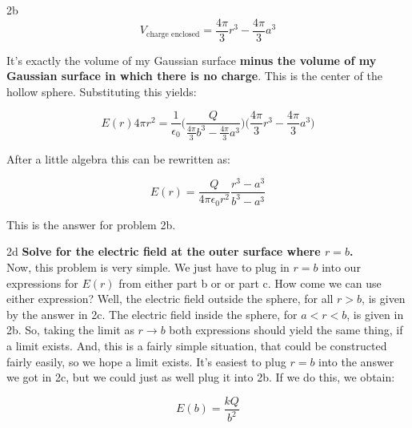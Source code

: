 \begin{homeworkProblem}[Quiz 3, Pr. 2]
\begin{homeworkSection}{2b}
        \[
        V_{\text{charge enclosed}} = \frac{4\pi}{3}r^3 -
        \frac{4\pi}{3}a^3
        \]

        It's exactly the volume of my Gaussian surface \textbf{minus the
        volume of my Gaussian surface in which there is no charge}. This
        is the center of the hollow sphere. Substituting this yields:

        \[
        E(r)4\pi r^2  = \frac{1}{\epsilon_0} \bigg(
        \frac{Q}{\frac{4\pi}{3}b^3 - \frac{4\pi}{3}a^3}\bigg) \bigg( \frac{4\pi}{3}
        r^3 -\frac{4\pi}{3}a^3 \bigg)
        \]

        After a little algebra this can be rewritten as:

        \[
        E(r) = \frac{Q}{4\pi \epsilon_0 r^2} \frac{r^3-a^3}{b^3-a^3}
        \]

        This is the answer for problem 2b.
    \end{homeworkSection}
    \begin{homeworkSection}{2d}
        \textbf{Solve for the electric field at the outer surface where
        $r=b$.}
        \\

        Now, this problem is very simple. We just have to plug in $r=b$
        into our expressions for $E(r)$ from either part b or or part c.
        How come we can use either expression? Well, the electric field
        outside the sphere, for all $r>b$, is given by the answer in 2c.
        The electric field inside the sphere, for $a<r<b$, is given in
        2b. So, taking the limit as $r\rightarrow b$ both expressions
        should yield the same thing, if a limit exists. And, this is a
        fairly simple situation, that could be constructed fairly
        easily, so we hope a limit exists. It's easiest to plug $r=b$
        into the answer we got in 2c, but we could just as well plug it
        into 2b. If we do this, we obtain:

        \[
        E(b) = \frac{kQ}{b^2}
        \]
    \end{homeworkSection}
\end{homeworkProblem}

